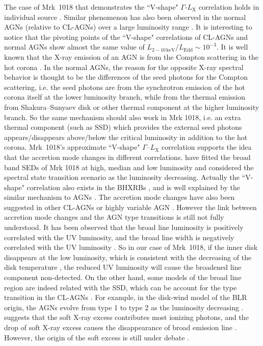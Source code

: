 \documentclass[twocolumn]{aastex63}
\begin{document}
 The case of Mrk~1018 that demonstrates the ``V-shape" $\Gamma$-$L_\mathrm{X}$ correlation holds in individual source \citep[see also in ][etc]{2020ApJ...890L..29A}. Similar phenomenon has also been observed in the normal AGNs (relative to CL-AGNs) over a large luminosity range \citep[e.g. ][]{2009MNRAS.399..349G, 2011A&A...530A.149Y}. It is interesting to notice that the pivoting points of the ``V-shape" correlations of CL-AGNs and normal AGNs show almost the same value of $L_\mathrm{2-10\,keV}/L_\mathrm{Edd}\sim 10^{-3}$. It is well known that the X-ray emission of an AGN is from the Compton scattering in the hot corona \citep[e.g.][]{1991ApJ...380L..51H}. In the normal AGNs, the reason for the opposite X-ray spectral behavior is thought to be the differences of the seed photons for the Compton scattering, i.e. the seed photons are from the synchrotron emission of the hot corona itself at the lower luminosity branch, while from the thermal emission from Shakura–Sunyaev disk \citep[SSD; e.g. ][]{2013ApJ...764....2Q} or other thermal component \citep{2015MNRAS.447.1692Y} at the higher luminosity branch. So the same mechanism should also work in Mrk 1018, i.e. an extra thermal component (such as SSD) which provides the external seed photons appears/disappears above/below the critical luminosity in addition to the hot corona. Mrk~1018's approximate ``V-shape" $\Gamma$--$L_\mathrm{X}$ correlation supports the idea that the accretion mode changes in different correlations. \citet{2018MNRAS.480.3898N} have fitted the broad band SEDs of Mrk 1018 at high, median and low luminosity and considered the spectral state transition scenario as the luminosity decreasing. Actually the ``V-shape" correlation also exists in the BHXRBs \citep[e.g.][]{2015PKAS...30..565Y} , and is well explained by the similar mechanism to AGNs \citep[e.g.][]{2011A&A...530A.149Y,2015MNRAS.447.1692Y}. The accretion mode changes have also been suggested in other CL-AGNs or highly variable AGN \citep{2019arXiv191203972L,2020ApJ...890L..29A,2020MNRAS.492.2335L}. However the link between accretion mode changes and the AGN type transitions is still not fully understood. It has been observed that the broad line luminosity is positively correlated with the UV luminosity, and the broad line width is negatively correlated with the UV luminosity \citep[e.g.][]{2019ApJ...885...44D}. So in our case of Mrk~1018, if the inner disk disappears at the low luminosity, which is consistent with the decreasing of the disk temperature \citep[see also ][]{2018MNRAS.480.3898N}, the reduced UV luminosity will cause the broadened line component non-detected. On the other hand, some models of the broad line region are indeed related with the SSD, which can be account for the type transition in the CL-AGNs \citep[see a recent review in ][and references therein]{2019OAst...28..200C}. For example, in the disk-wind model of the BLR origin, the AGNs evolve from type 1 to type 2 as the luminosity decreasing \citep[see][]{2014MNRAS.438.3340E}. \citet{2018MNRAS.480.3898N} suggests that the soft X-ray excess contributes most ionizing photons, and the drop of soft X-ray excess causes the disappearance of broad emission line \citep[see also in ][]{2020MNRAS.492.2335L}. However, the origin of the soft excess is still under debate \citep[e.g.][]{2018A&A...611A..59P}. 
\end{document}
